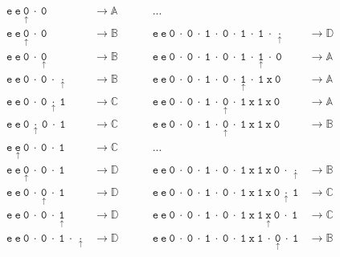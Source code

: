 \documentclass[Master.tex]{subfiles}
\begin{document}
\begin{equation*}
\begin{aligned}
&\mathtt{e\ e\ \underset{\uparrow}{0}\ \cdot\ 0} & \rightarrow \mathbb{A}\ \ \ \ \ \ \ \ \ \ & ...&\\
&\mathtt{e\ e\ \underset{\uparrow}{0}\ \cdot\ 0} & \rightarrow \mathbb{B}\ \ \ \ \ \ \ \ \ \ & \mathtt{e\ e\ 0\ \cdot\ 0\ \cdot\ 1\ \cdot\ 0\ \cdot\ 1\ \cdot\ 1\ \cdot\ \underset{\uparrow}{\cdot}} & \rightarrow \mathbb{D}\\
&\mathtt{e\ e\ 0\ \cdot\ \underset{\uparrow}{0}} & \rightarrow \mathbb{B}\ \ \ \ \ \ \ \ \ \ & \mathtt{e\ e\ 0\ \cdot\ 0\ \cdot\ 1\ \cdot\ 0\ \cdot\ 1\ \cdot\ \underset{\uparrow}{1}\ \cdot\ 0} & \rightarrow \mathbb{A}\\
&\mathtt{e\ e\ 0\ \cdot\ 0\ \cdot\ \underset{\uparrow}{\cdot}} & \rightarrow \mathbb{B}\ \ \ \ \ \ \ \ \ \ & \mathtt{e\ e\ 0\ \cdot\ 0\ \cdot\ 1\ \cdot\ 0\ \cdot\ \underset{\uparrow}{1}\ \cdot\ 1\ x\ 0} & \rightarrow \mathbb{A}\\
&\mathtt{e\ e\ 0\ \cdot\ 0\ \underset{\uparrow}{\cdot}\ 1} & \rightarrow \mathbb{C}\ \ \ \ \ \ \ \ \ \ & \mathtt{e\ e\ 0\ \cdot\ 0\ \cdot\ 1\ \cdot\ \underset{\uparrow}{0}\ \cdot\ 1\ x\ 1\ x\ 0} & \rightarrow \mathbb{A}\\
&\mathtt{e\ e\ 0\ \underset{\uparrow}{\cdot}\ 0\ \cdot\ 1} & \rightarrow \mathbb{C}\ \ \ \ \ \ \ \ \ \ & \mathtt{e\ e\ 0\ \cdot\ 0\ \cdot\ 1\ \cdot\ \underset{\uparrow}{0}\ \cdot\ 1\ x\ 1\ x\ 0} & \rightarrow \mathbb{B}\\
&\mathtt{e\ \underset{\uparrow}{e}\ 0\ \cdot\ 0\ \cdot\ 1} & \rightarrow \mathbb{C}\ \ \ \ \ \ \ \ \ \ & ...&\\
&\mathtt{e\ e\ \underset{\uparrow}{0}\ \cdot\ 0\ \cdot\ 1} & \rightarrow \mathbb{D}\ \ \ \ \ \ \ \ \ \ & \mathtt{e\ e\ 0\ \cdot\ 0\ \cdot\ 1\ \cdot\ 0\ \cdot\ 1\ x\ 1\ x\ 0\ \cdot\ \underset{\uparrow}{\cdot}} & \rightarrow \mathbb{B}\\
&\mathtt{e\ e\ 0\ \cdot\ \underset{\uparrow}{0}\ \cdot\ 1} & \rightarrow \mathbb{D}\ \ \ \ \ \ \ \ \ \ & \mathtt{e\ e\ 0\ \cdot\ 0\ \cdot\ 1\ \cdot\ 0\ \cdot\ 1\ x\ 1\ x\ 0\ \underset{\uparrow}{\cdot}\ 1} & \rightarrow \mathbb{C}\\
&\mathtt{e\ e\ 0\ \cdot\ 0\ \cdot\ \underset{\uparrow}{1}} & \rightarrow \mathbb{D}\ \ \ \ \ \ \ \ \ \ & \mathtt{e\ e\ 0\ \cdot\ 0\ \cdot\ 1\ \cdot\ 0\ \cdot\ 1\ x\ 1\ \underset{\uparrow}{x}\ 0\ \cdot\ 1} & \rightarrow \mathbb{C}\\
&\mathtt{e\ e\ 0\ \cdot\ 0\ \cdot\ 1\ \cdot\ \underset{\uparrow}{\cdot}} & \rightarrow \mathbb{D}\ \ \ \ \ \ \ \ \ \ & \mathtt{e\ e\ 0\ \cdot\ 0\ \cdot\ 1\ \cdot\ 0\ \cdot\ 1\ x\ 1\ \cdot\ \underset{\uparrow}{0}\ \cdot\ 1} & \rightarrow \mathbb{B}\\

\end{aligned}
\end{equation*}
\end{document}
